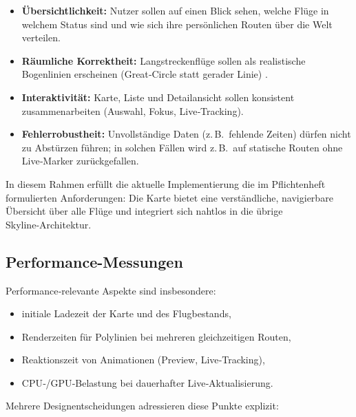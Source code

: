 \begin{itemize}
  \item \textbf{Übersichtlichkeit:} Nutzer sollen auf einen Blick sehen, welche Flüge in welchem Status sind und wie sich ihre persönlichen Routen über die Welt verteilen.
  \item \textbf{Räumliche Korrektheit:} Langstreckenflüge sollen als realistische Bogenlinien erscheinen (Great‑Circle statt gerader Linie) \cite{movableTypeLatLong}.
  \item \textbf{Interaktivität:} Karte, Liste und Detailansicht sollen konsistent zusammenarbeiten (Auswahl, Fokus, Live‑Tracking).
  \item \textbf{Fehlerrobustheit:} Unvollständige Daten (z.\,B.\ fehlende Zeiten) dürfen nicht zu Abstürzen führen; in solchen Fällen wird z.\,B.\ auf statische Routen ohne Live‑Marker zurückgefallen.
\end{itemize}

In diesem Rahmen erfüllt die aktuelle Implementierung die im Pflichtenheft formulierten Anforderungen: Die Karte bietet eine verständliche, navigierbare Übersicht über alle Flüge und integriert sich nahtlos in die übrige Skyline‑Architektur.

\subsection{Performance-Messungen}

Performance‑relevante Aspekte sind insbesondere:

\begin{itemize}
  \item initiale Ladezeit der Karte und des Flugbestands,
  \item Renderzeiten für Polylinien bei mehreren gleichzeitigen Routen,
  \item Reaktionszeit von Animationen (Preview, Live‑Tracking),
  \item CPU‑/GPU‑Belastung bei dauerhafter Live‑Aktualisierung.
\end{itemize}

Mehrere Designentscheidungen adressieren diese Punkte explizit:

